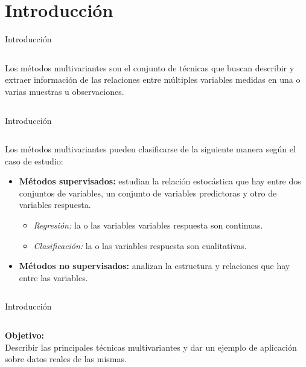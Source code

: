 \section{Introducción}
\begin{frame}{Introducción}
\begin{columns}
\begin{column}{0.9\textwidth}
\begin{defi}
Los métodos multivariantes son el conjunto de técnicas que buscan describir y extraer información de las relaciones entre múltiples variables medidas en una o varias muestras u observaciones. 
\end{defi}
\end{column}
\end{columns}

\end{frame}

\begin{frame}{Introducción}
\begin{columns}
\begin{column}{0.9\textwidth}
Los métodos multivariantes pueden clasificarse de la siguiente manera según el caso de estudio:
\begin{itemize}
\item \textbf{Métodos supervisados:} estudian la relación estocástica que hay entre dos conjuntos de variables, un conjunto de variables predictoras y otro de variables respuesta. 
\begin{itemize}
\item \textit{Regresión:} la o las  variables variables respuesta son continuas. 
\item \textit{Clasificación: }la o las variables respuesta son cualitativas. 
\end{itemize}
\item \textbf{Métodos no supervisados: }analizan la estructura y relaciones que hay entre las variables.
\end{itemize}
\end{column}
\end{columns}
\end{frame}

\begin{frame}{Introducción}
\begin{columns}
\begin{column}{0.9\textwidth}
\textbf{Objetivo: }\\
Describir las principales técnicas multivariantes y dar un ejemplo de aplicación sobre datos reales de las mismas.
\end{column}
\end{columns}
\end{frame}
